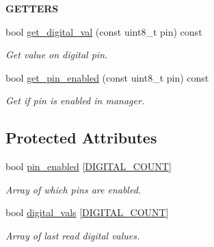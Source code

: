 \begin{Indent}{\bf G\+E\+T\+T\+E\+RS}\par
\begin{DoxyCompactItemize}
\item 
bool \hyperlink{class_loom___digital_a96a8539a0c35d2f9d7c629238f140d58}{get\+\_\+digital\+\_\+val} (const uint8\+\_\+t pin) const 
\begin{DoxyCompactList}\small\item\em Get value on digital pin. \end{DoxyCompactList}\item 
bool \hyperlink{class_loom___digital_acb19202710905340beef9790d9db1a99}{get\+\_\+pin\+\_\+enabled} (const uint8\+\_\+t pin) const 
\begin{DoxyCompactList}\small\item\em Get if pin is enabled in manager. \end{DoxyCompactList}\end{DoxyCompactItemize}
\end{Indent}
\subsection*{Protected Attributes}
\begin{DoxyCompactItemize}
\item 
bool \hyperlink{class_loom___digital_a55f8c126c2bba909d412aebfefc024de}{pin\+\_\+enabled} \mbox{[}\hyperlink{_digital_8h_ae667578f4adee1cbda0e5e5930bac7f3}{D\+I\+G\+I\+T\+A\+L\+\_\+\+C\+O\+U\+NT}\mbox{]}
\begin{DoxyCompactList}\small\item\em Array of which pins are enabled. \end{DoxyCompactList}\item 
bool \hyperlink{class_loom___digital_a34b30d1136b394a78e0ba09868cfbf35}{digital\+\_\+vals} \mbox{[}\hyperlink{_digital_8h_ae667578f4adee1cbda0e5e5930bac7f3}{D\+I\+G\+I\+T\+A\+L\+\_\+\+C\+O\+U\+NT}\mbox{]}
\begin{DoxyCompactList}\small\item\em Array of last read digital values. \end{DoxyCompactList}\end{DoxyCompactItemize}
